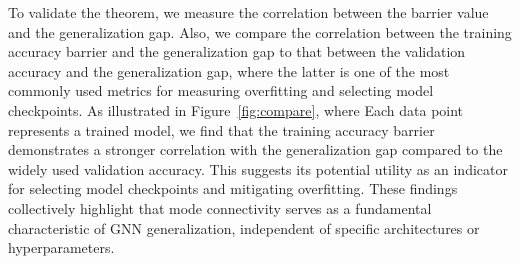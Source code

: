 
To validate the theorem, we measure the correlation between the barrier value and the generalization gap. Also, we compare the correlation between the training accuracy barrier and the generalization gap to that between the validation accuracy and the generalization gap, where the latter is one of the most commonly used metrics for measuring overfitting and selecting model checkpoints. As illustrated in Figure~\ref{fig:compare}, where Each data point represents a trained model, we find that the training accuracy barrier demonstrates a stronger correlation with the generalization gap compared to the widely used validation accuracy. This suggests its potential utility as an indicator for selecting model checkpoints and mitigating overfitting. These findings collectively highlight that mode connectivity serves as a fundamental characteristic of GNN generalization, independent of specific architectures or hyperparameters.



